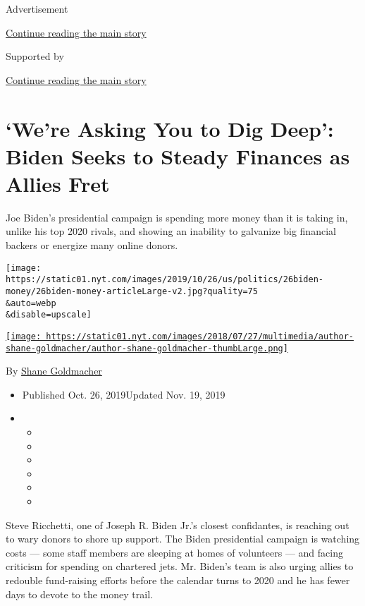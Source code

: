 Advertisement

\protect\hyperlink{after-top}{Continue reading the main story}

Supported by

\protect\hyperlink{after-sponsor}{Continue reading the main story}

\hypertarget{were-asking-you-to-dig-deep-biden-seeks-to-steady-finances-as-allies-fret}{%
\section{`We're Asking You to Dig Deep': Biden Seeks to Steady Finances
as Allies
Fret}\label{were-asking-you-to-dig-deep-biden-seeks-to-steady-finances-as-allies-fret}}

Joe Biden's presidential campaign is spending more money than it is
taking in, unlike his top 2020 rivals, and showing an inability to
galvanize big financial backers or energize many online donors.

\texttt{[image: https://static01.nyt.com/images/2019/10/26/us/politics/26biden-money/26biden-money-articleLarge-v2.jpg?quality=75\\\&auto=webp\\\&disable=upscale]}

\href{https://www.nytimes.com/by/shane-goldmacher}{\texttt{[image: https://static01.nyt.com/images/2018/07/27/multimedia/author-shane-goldmacher/author-shane-goldmacher-thumbLarge.png]}}

By \href{https://www.nytimes.com/by/shane-goldmacher}{Shane Goldmacher}

\begin{itemize}
\item
  Published Oct. 26, 2019Updated Nov. 19, 2019
\item
  \begin{itemize}
  \item
  \item
  \item
  \item
  \item
  \item
  \end{itemize}
\end{itemize}

Steve Ricchetti, one of Joseph R. Biden Jr.'s closest confidantes, is
reaching out to wary donors to shore up support. The Biden presidential
campaign is watching costs --- some staff members are sleeping at homes
of volunteers --- and facing criticism for spending on chartered jets.
Mr. Biden's team is also urging allies to redouble fund-raising efforts
before the calendar turns to 2020 and he has fewer days to devote to the
money trail.


